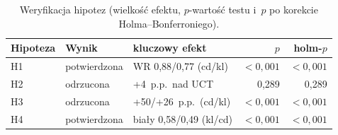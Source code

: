 \begin{table}[H]
\centering
\small
\begin{tabular}{l l p{4.6cm} r r}
\toprule
Hipoteza & Wynik & kluczowy efekt & $p$ & holm-$p$ \\
\midrule
H1 & potwierdzona & WR 0,88/0,77 (cd/kl) & $<\!0{,}001$ & $<\!0{,}001$ \\
H2 & odrzucona & +4~p.p.\ nad UCT & 0,289 & 0,289 \\
H3 & odrzucona & +50/+26~p.p.\ (cd/kl) & $<\!0{,}001$ & $<\!0{,}001$ \\
H4 & potwierdzona & biały 0,58/0,49 (kl/cd) & $<\!0{,}001$ & $<\!0{,}001$ \\
\bottomrule
\end{tabular}
\caption{Weryfikacja hipotez (wielkość efektu, $p$-wartość testu i~$p$ po korekcie Holma--Bonferroniego).}
\label{tab:hypotheses}
\end{table}